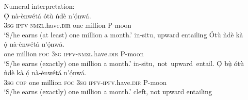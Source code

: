 \documentclass[output=paper,colorlinks,citecolor=brown]{langscibook}
\begin{document}
\ea%
    \label{ex:amaechi:10}
    Numeral interpretation:\\
    \ea\label{ex:amaechi:10a}
    \gll    \d{\'O} n\`a-\`enw\'et\'a \'ot\`u \`nd\`e n'\d{\'o}nw\'a.\\
            3\textsc{sg} \textsc{ipfv}-\textsc{nmzl}.have.\textsc{dir} one million P-moon\\
    \glt    `S/he earns (at least) one million a month.' \hfill{in-situ, upward entailing}
    \ex\label{ex:amaechi:10b}
    \gll    \'Ot\`u \`nd\`e k\`a \d{\'o} n\`a-\`enw\'et\'a n'\d{\'o}nw\'a.\\
            one million \textsc{foc} 3\textsc{sg} \textsc{ipfv}-\textsc{nmzl}.have.\textsc{dir} P-moon\\
    \glt    `S/he earns (exactly) one million a month.' \hfill{in-situ,~not~upward~entail.}
    \ex\label{ex:amaechi:10c}
    \gll    \d{\'O} b\d{\`u} \'ot\`u \`nd\`e k\`a \d{\'o} n\`a-\`enw\'et\'a n'\d{\'o}nw\'a.\\
            3\textsc{sg} \textsc{cop} one million \textsc{foc} 3\textsc{sg} \textsc{ipfv}-\textsc{ipfv}.have.\textsc{dir} P-moon\\
    \glt    `S/he earns (exactly) one million a month.' \hfill{cleft, not upward entailing}
    \z
\z


\end{document}
